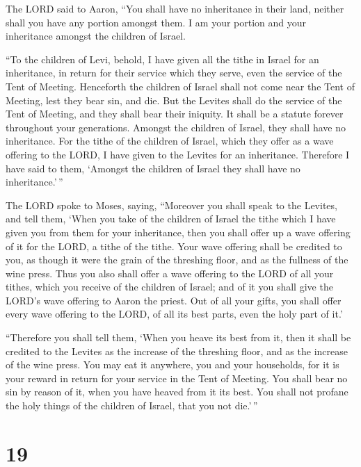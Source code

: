  The LORD said to Aaron, ``You shall have no inheritance in
their land, neither shall you have any portion amongst them. I am your
portion and your inheritance amongst the children of Israel.

 ``To the children of Levi, behold, I have given all the
tithe in Israel for an inheritance, in return for their service which
they serve, even the service of the Tent of Meeting. 
Henceforth the children of Israel shall not come near the Tent of
Meeting, lest they bear sin, and die.  But the Levites
shall do the service of the Tent of Meeting, and they shall bear their
iniquity. It shall be a statute forever throughout your generations.
Amongst the children of Israel, they shall have no inheritance.
 For the tithe of the children of Israel, which they offer
as a wave offering to the LORD, I have given to the Levites for an
inheritance. Therefore I have said to them, `Amongst the children of
Israel they shall have no inheritance.'\,''

 The LORD spoke to Moses, saying,  ``Moreover
you shall speak to the Levites, and tell them, `When you take of the
children of Israel the tithe which I have given you from them for your
inheritance, then you shall offer up a wave offering of it for the LORD,
a tithe of the tithe.  Your wave offering shall be credited
to you, as though it were the grain of the threshing floor, and as the
fullness of the wine press.  Thus you also shall offer a
wave offering to the LORD of all your tithes, which you receive of the
children of Israel; and of it you shall give the LORD's wave offering to
Aaron the priest.  Out of all your gifts, you shall offer
every wave offering to the LORD, of all its best parts, even the holy
part of it.'

 ``Therefore you shall tell them, `When you heave its best
from it, then it shall be credited to the Levites as the increase of the
threshing floor, and as the increase of the wine press. 
You may eat it anywhere, you and your households, for it is your reward
in return for your service in the Tent of Meeting.  You
shall bear no sin by reason of it, when you have heaved from it its
best. You shall not profane the holy things of the children of Israel,
that you not die.'\,''

\hypertarget{section-18}{%
\section{19}\label{section-18}}

